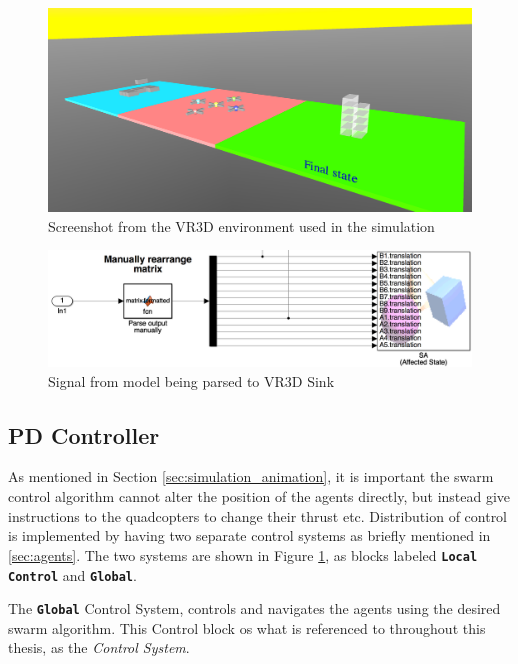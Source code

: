 \begin{figure}[H]
	\centering
	\includegraphics[width=1\columnwidth]{figures/3d_platform}
  	\caption{\label{fig:3d_overview}Screenshot from the VR3D environment used in the simulation}
\end{figure}

\begin{figure}[H]
	\centering
	\includegraphics[width=1\columnwidth]{figures/3d_sink}
  	\caption{\label{fig:3d_sink}Signal from model being parsed to VR3D Sink}
\end{figure}



\subsection{PD Controller}
\label{sec:sim_pid}

As mentioned in Section \ref{sec:simulation_animation}, it is important the swarm control algorithm cannot alter the position of the agents directly, but instead give instructions to the quadcopters to change their thrust etc. Distribution of control is implemented by having two separate control systems as briefly mentioned in \ref{sec:agents}. The two systems are shown in Figure \ref{fig:3d_overview}, as blocks labeled \textbf{\texttt{Local Control}} and \textbf{\texttt{Global}}. 

The \textbf{\texttt{Global}} Control System, controls and navigates the agents using the desired swarm algorithm. This Control block os what is referenced to throughout this thesis, as the \textit{Control System}. 

